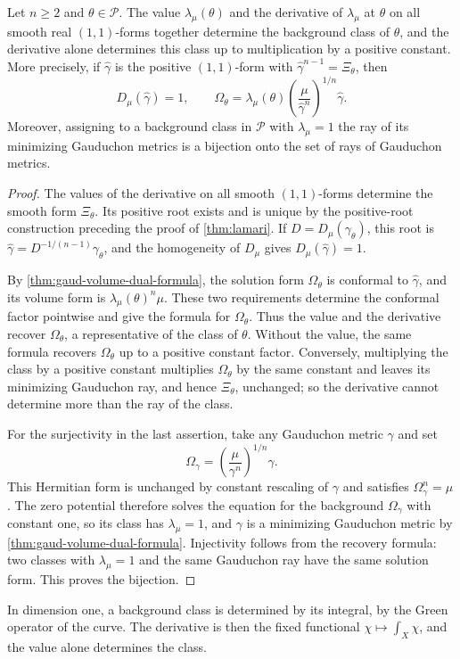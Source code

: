 \begin{proposition}\label{prop:gaud-derivative-recovery}
Let $n\geq2$ and $\theta\in\mathscr P$. The value $\lambda_\mu(\theta)$ and the derivative of $\lambda_\mu$ at $\theta$ on all smooth real $(1,1)$-forms together determine the background class of $\theta$, and the derivative alone determines this class up to multiplication by a positive constant. More precisely, if $\widehat\gamma$ is the positive $(1,1)$-form with $\widehat\gamma^{n-1}=\Xi_\theta$, then
\[
 D_\mu(\widehat\gamma)=1,
 \qquad
 \Omega_\theta=
   \lambda_\mu(\theta)
       \left(\frac{\mu}{\widehat\gamma^n}\right)^{1/n}
       \widehat\gamma.
\]
Moreover, assigning to a background class in $\mathscr P$ with $\lambda_\mu=1$ the ray of its minimizing Gauduchon metrics is a bijection onto the set of rays of Gauduchon metrics.
\end{proposition}
\begin{proof}
The values of the derivative on all smooth $(1,1)$-forms determine the smooth form $\Xi_\theta$. Its positive root exists and is unique by the positive-root construction preceding the proof of \cref{thm:lamari}. If $D=D_\mu(\gamma_\theta)$, this root is $\widehat\gamma=D^{-1/(n-1)}\gamma_\theta$, and the homogeneity of $D_\mu$ gives $D_\mu(\widehat\gamma)=1$.

By \cref{thm:gaud-volume-dual-formula}, the solution form $\Omega_\theta$ is conformal to $\widehat\gamma$, and its volume form is $\lambda_\mu(\theta)^n\mu$. These two requirements determine the conformal factor pointwise and give the formula for $\Omega_\theta$. Thus the value and the derivative recover $\Omega_\theta$, a representative of the class of $\theta$. Without the value, the same formula recovers $\Omega_\theta$ up to a positive constant factor. Conversely, multiplying the class by a positive constant multiplies $\Omega_\theta$ by the same constant and leaves its minimizing Gauduchon ray, and hence $\Xi_\theta$, unchanged; so the derivative cannot determine more than the ray of the class.

For the surjectivity in the last assertion, take any Gauduchon metric $\gamma$ and set
\[
 \Omega_\gamma=\left(\frac\mu{\gamma^n}\right)^{1/n}\gamma.
\]
This Hermitian form is unchanged by constant rescaling of $\gamma$ and satisfies $\Omega_\gamma^n=\mu$. The zero potential therefore solves the equation for the background $\Omega_\gamma$ with constant one, so its class has $\lambda_\mu=1$, and $\gamma$ is a minimizing Gauduchon metric by \cref{thm:gaud-volume-dual-formula}. Injectivity follows from the recovery formula: two classes with $\lambda_\mu=1$ and the same Gauduchon ray have the same solution form. This proves the bijection.
\end{proof}

In dimension one, a background class is determined by its integral, by the Green operator of the curve. The derivative is then the fixed functional $\chi\mapsto\int_X\chi$, and the value alone determines the class.
